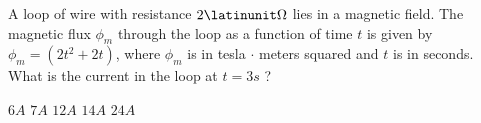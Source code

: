 \begin{questions}\setcounter{question}{22}\question
A loop of wire with resistance $2 \latinunit\Omega$ lies in a magnetic field. The magnetic flux $\phi_{m}$ through the loop as a function of time $t$ is given by $\phi_{m}=\left(2 t^{2}+2 t\right)$, where $\phi_{m}$ is in tesla $\cdot$ meters squared and $t$ is in seconds. What is the current in the loop at $t=3 \unit{s}$ ?

\begin{oneparchoices}
\choice $6 \unit{A}$
\choice $7 \unit{A}$
\choice $12 \unit{A}$
\choice $14 \unit{A}$
\choice $24 \unit{A}$
\end{oneparchoices}\end{questions}
